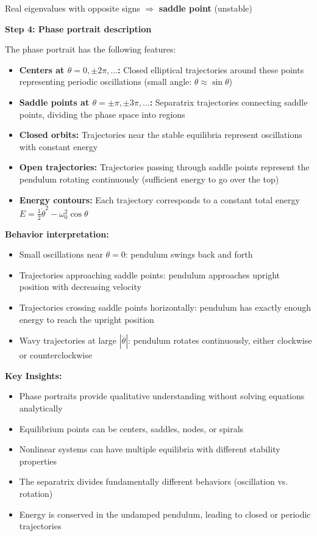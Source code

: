 \documentclass[11pt,a4paper]{article}
\begin{document}
Real eigenvalues with opposite signs $\Rightarrow$ \textbf{saddle point} (unstable)

\textbf{Step 4: Phase portrait description}

The phase portrait has the following features:

\begin{itemize}
  \item \textbf{Centers at $\theta = 0, \pm 2\pi, \ldots$:} Closed elliptical trajectories around these points representing periodic oscillations (small angle: $\theta \approx \sin\theta$)

  \item \textbf{Saddle points at $\theta = \pm\pi, \pm 3\pi, \ldots$:} Separatrix trajectories connecting saddle points, dividing the phase space into regions

  \item \textbf{Closed orbits:} Trajectories near the stable equilibria represent oscillations with constant energy

  \item \textbf{Open trajectories:} Trajectories passing through saddle points represent the pendulum rotating continuously (sufficient energy to go over the top)

  \item \textbf{Energy contours:} Each trajectory corresponds to a constant total energy $E = \frac{1}{2}\dot{\theta}^2 - \omega_0^2\cos\theta$
\end{itemize}

\textbf{Behavior interpretation:}
\begin{itemize}
  \item Small oscillations near $\theta = 0$: pendulum swings back and forth
  \item Trajectories approaching saddle points: pendulum approaches upright position with decreasing velocity
  \item Trajectories crossing saddle points horizontally: pendulum has exactly enough energy to reach the upright position
  \item Wavy trajectories at large $|\dot{\theta}|$: pendulum rotates continuously, either clockwise or counterclockwise
\end{itemize}

\textbf{Key Insights:}
\begin{itemize}
  \item Phase portraits provide qualitative understanding without solving equations analytically
  \item Equilibrium points can be centers, saddles, nodes, or spirals
  \item Nonlinear systems can have multiple equilibria with different stability properties
  \item The separatrix divides fundamentally different behaviors (oscillation vs. rotation)
  \item Energy is conserved in the undamped pendulum, leading to closed or periodic trajectories
\end{itemize}
\end{document}
